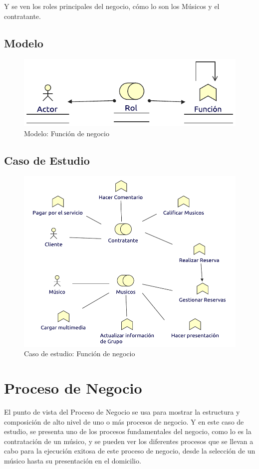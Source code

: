 Y se ven los roles principales del negocio, cómo lo son los Músicos y el contratante. 

\subsection{Modelo}
\begin{figure}[h!]
	\centering
	\includegraphics[width=0.8\linewidth]{Arquitectura/Negocio/imgs/FuncionNegocioMetamodelo.pdf}
	\caption{Modelo: Función de negocio}
\end{figure}
\newpage
\subsection{Caso de Estudio}

\begin{figure}[h!]
	\centering
	\includegraphics[width=\linewidth]{Arquitectura/Negocio/imgs/FuncionNegocio.pdf}
	\caption{Caso de estudio: Función de negocio}
\end{figure}
\newpage

\section{Proceso de Negocio}
El punto de vista del Proceso de Negocio se usa para mostrar la estructura y composición de alto nivel de uno o más procesos de negocio. Y en este caso de estudio, se presenta uno de los procesos fundamentales del negocio, como lo es la contratación de un músico, y se pueden ver los diferentes procesos que se llevan a cabo para la ejecución exitosa de este proceso de negocio, desde la selección de un músico hasta su presentación en el domicilio.
